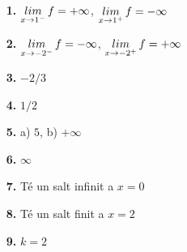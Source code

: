 \documentclass[a4paper, pdf, twoside]{book}
\begin{document}
\begin{multicols}{2}
\begin{enumerate}
\vspace{0.25cm}
\item[\fontfamily{phv}\selectfont\color{blue}\textbf{1. }]  \scalebox{0.6}{\simbolclau } 
$\mathop{lim}\limits_{x\to 1^-} f=+\infty $, $\mathop{lim}\limits_{x\to 1^+} f=-\infty $
\vspace{0.25cm}
\item[\fontfamily{phv}\selectfont\color{blue}\textbf{2. }]  \scalebox{0.6}{\simbolclau } 
$\mathop{lim}\limits_{x\to -2^-} f=-\infty $, $\mathop{lim}\limits_{x\to -2^+} f=+\infty $
\vspace{0.25cm}
\item[\fontfamily{phv}\selectfont\color{blue}\textbf{3. }]  \scalebox{0.6}{\simbolclau } 
$-2/3$
\vspace{0.25cm}
\item[\fontfamily{phv}\selectfont\color{blue}\textbf{4. }]  \scalebox{0.6}{\simbolclau } 
$1/2$
\vspace{0.25cm}
\item[\fontfamily{phv}\selectfont\color{blue}\textbf{5. }]  \scalebox{0.6}{\simbolclau } 
a) $5$, b) $+\infty $
\vspace{0.25cm}
\item[\fontfamily{phv}\selectfont\color{blue}\textbf{6. }]  \scalebox{0.6}{\simbolclau } 
$\infty $
\vspace{0.25cm}
\item[\fontfamily{phv}\selectfont\color{blue}\textbf{7. }]  \scalebox{0.6}{\simbolclau } 
Té un salt infinit a $x=0$
\vspace{0.25cm}
\item[\fontfamily{phv}\selectfont\color{blue}\textbf{8. }]  \scalebox{0.6}{\simbolclau } 
Té un salt finit a $x=2$
\vspace{0.25cm}
\item[\fontfamily{phv}\selectfont\color{blue}\textbf{9. }]  \scalebox{0.6}{\simbolclau } 
$k=2$
 \end{enumerate}
\end{multicols}
\def\currentname{Solucions del Tema 7}
\vspace*{0.75cm}

 

\vspace*{0.4cm}
 {}
\vspace{0.3cm}

\end{document}
